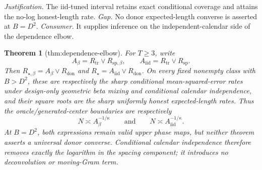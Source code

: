 \documentclass{article}
\newtheorem{theorem}{Theorem}
\begin{document}
\par\smallskip\noindent \textit{Justification.} The iid-tuned interval retains exact conditional coverage and attains the no-log honest-length rate. \textit{Gap.} No donor expected-length converse is asserted at \(B=D^2\). \textit{Consumer.} It supplies inference on the independent-calendar side of the dependence elbow.

\begin{theorem}[thm:dependence-elbow]\label{thm:dependence-elbow}
For \(T\ge3\), write
\[
A_\beta=R_{\mathrm{tr}}\vee R_{\mathrm{sp},\beta},
\qquad
A_{\mathrm{iid}}=R_{\mathrm{tr}}\vee R_{\mathrm{sp}}.
\]
Then \(R_{\star,\beta}=A_\beta\vee R_{\mathrm{don}}\) and \(R_\star=A_{\mathrm{iid}}\vee R_{\mathrm{don}}\).  On every fixed nonempty class with \(B>D^2\), these are respectively the sharp conditional mean-squared-error rates under design-only geometric beta mixing and conditional calendar independence, and their square roots are the sharp uniformly honest expected-length rates.  Thus the oracle/generated-center boundaries are respectively
\[
N\asymp A_\beta^{-1/\kappa}
\qquad\text{and}\qquad
N\asymp A_{\mathrm{iid}}^{-1/\kappa}.
\]
At \(B=D^2\), both expressions remain valid upper phase maps, but neither theorem asserts a universal donor converse.  Conditional calendar independence therefore removes exactly the logarithm in the spacing component; it introduces no deconvolution or moving-Gram term.
\end{theorem}
\end{document}
